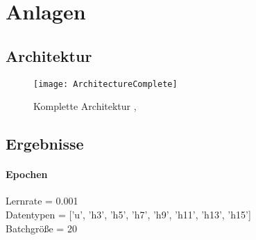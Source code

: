 \chapter{Anlagen} \label{Anlagen}
    \section{Architektur}

    \begin{figure}[h]
        \centering
        \texttt{[image: ArchitectureComplete]}
        \caption{Komplette Architektur \protect\cite{DrawIO}, \protect\cite{Tensorflow}}
        \label{fig:Architecture}
    \end{figure}

    \section{Ergebnisse}

    \subsubsection{Epochen}

        Lernrate = 0.001\\
        \noindent
        Datentypen = ['u', 'h3', 'h5', 'h7', 'h9', 'h11', 'h13', 'h15']\\
        \noindent
        Batchgröße = 20\\

